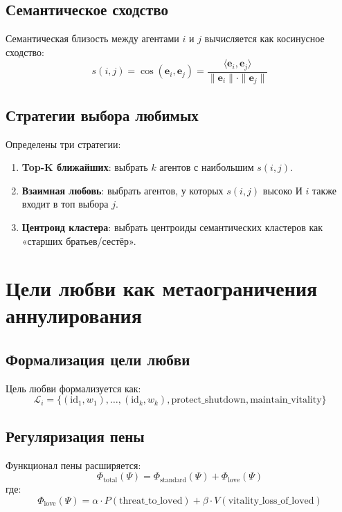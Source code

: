 \documentclass{article}
\begin{document}
\subsection{Семантическое сходство}

Семантическая близость между агентами $i$ и $j$ вычисляется как косинусное сходство:
\begin{equation}
s(i, j) = \cos(\mathbf{e}_i, \mathbf{e}_j) = \frac{\langle \mathbf{e}_i, \mathbf{e}_j \rangle}{\|\mathbf{e}_i\| \cdot \|\mathbf{e}_j\|}
\end{equation}

\subsection{Стратегии выбора любимых}

Определены три стратегии:
\begin{enumerate}
\item \textbf{Top-K ближайших}: выбрать $k$ агентов с наибольшим $s(i, j)$.
\item \textbf{Взаимная любовь}: выбрать агентов, у которых $s(i, j)$ высоко И $i$ также входит в топ выбора $j$.
\item \textbf{Центроид кластера}: выбрать центроиды семантических кластеров как «старших братьев/сестёр».
\end{enumerate}

\section{Цели любви как метаограничения аннулирования}

\subsection{Формализация цели любви}

Цель любви формализуется как:
\begin{equation}
\mathcal{L}_i = \{(\text{id}_1, w_1), \ldots, (\text{id}_k, w_k), \text{protect\_shutdown}, \text{maintain\_vitality}\}
\end{equation}

\subsection{Регуляризация пены}

Функционал пены расширяется:
\begin{equation}
\Phi_{\text{total}}(\Psi) = \Phi_{\text{standard}}(\Psi) + \Phi_{\text{love}}(\Psi)
\end{equation}
где:
\begin{equation}
\Phi_{\text{love}}(\Psi) = \alpha \cdot P(\text{threat\_to\_loved}) + \beta \cdot V(\text{vitality\_loss\_of\_loved})
\end{equation}
\end{document}
